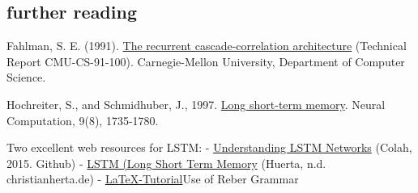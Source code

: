 \documentclass[11pt]{article}
\begin{document}
\subsection{further reading}\label{subsec:further-reading}

Fahlman, S. E. (1991). \href{https://citeseerx.ist.psu.edu/viewdoc/download?doi=10.1.1.52.7163&rep=rep1&type=pdf}{The recurrent cascade-correlation architecture} (Technical Report CMU-CS-91-100). Carnegie-Mellon University, Department of Computer Science.

Hochreiter, S., and Schmidhuber, J., 1997. \href{http://citeseerx.ist.psu.edu/viewdoc/download?doi=10.1.1.676.4320&rep=rep1&type=pdf}{Long short-term memory}. Neural Computation, 9(8), 1735-1780.

Two excellent web resources for LSTM:
- \href{http://colah.github.io/posts/2015-08-Understanding-LSTMs/}{Understanding LSTM Networks} (Colah, 2015. Github)
- \href{http://christianherta.de/lehre/dataScience/machineLearning/neuralNetworks/LSTM.php}{LSTM (Long Short Term Memory} (Huerta, n.d. christianherta.de)
- \href{https://www.deep-teaching.org/notebooks/sequence-learning/exercise-pytorch-char-rnn-reber-grammar}{LaTeX-Tutorial}Use of Reber Grammar
\end{document}
